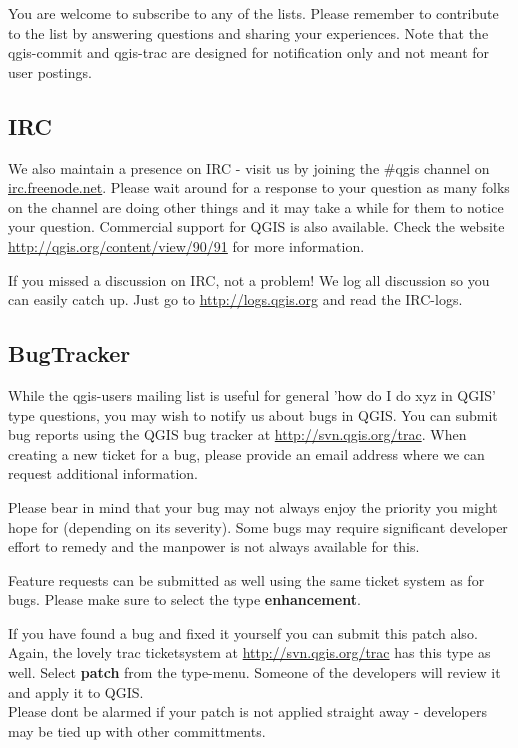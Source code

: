 You are welcome to subscribe to any of the lists. Please remember to contribute to the list by answering questions and sharing your experiences. Note that the qgis-commit and qgis-trac are designed for notification only and not meant for user postings. 

\subsection{IRC}
We also maintain a presence on IRC - visit us by joining the \#qgis channel on
\url{irc.freenode.net}. Please wait around for a response to your question as many
folks on the channel are doing other things and it may take a while for them to
notice your question. Commercial support for QGIS is also available.
Check the website \url{http://qgis.org/content/view/90/91} for more information.

If you missed a discussion on IRC, not a problem! We log all discussion so you can 
easily catch up. Just go to \url{http://logs.qgis.org} and read the IRC-logs.

\subsection{BugTracker}
While the qgis-users mailing list is useful for general 'how do I do xyz in
QGIS' type questions, you may wish to notify us about bugs in QGIS. You can
submit bug reports using the QGIS bug tracker at \url{http://svn.qgis.org/trac}. 
When creating a new ticket for a bug, please provide an email
address where we can request additional information.

Please bear in
mind that your bug may not always enjoy the priority you might hope for
(depending on its severity). Some bugs may require significant
developer effort to remedy and the manpower is not always available for this.

Feature requests can be submitted as well using the same ticket system as for bugs.
Please make sure to select the type \textbf{enhancement}.

If you have found a bug and fixed it yourself you can submit this patch also.
Again, the lovely trac ticketsystem at \url{http://svn.qgis.org/trac} has this type as well. 
Select \textbf{patch} from the type-menu. Someone of the developers will review it and
apply it to QGIS. \\
Please dont be alarmed if your patch is not applied straight away - developers
may be tied up with other committments.

